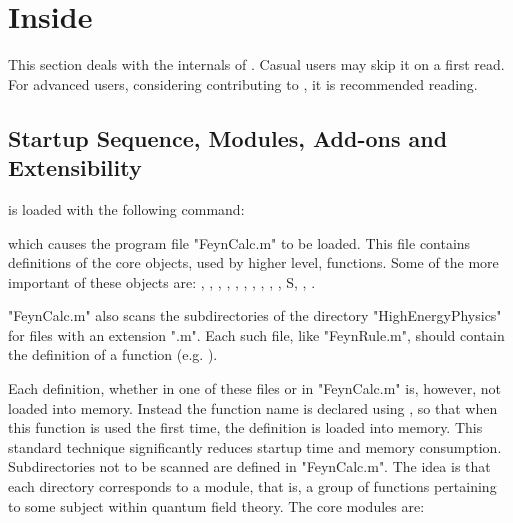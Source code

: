 \section{Inside \fc}
\label{inside}

This section deals with the internals of \fc. Casual users may skip it on a
first read. For advanced users, considering contributing to \fc, it is
recommended reading.

\subsection{Startup Sequence, Modules, Add-ons and Extensibility}
\label{modules}

\fc is loaded with the following command:


which causes the program file "FeynCalc.m" to be loaded. This file contains definitions of the core objects, used by higher level, functions. Some of the more important of these objects are: , , , , , , , , , , S, , .

"FeynCalc.m" also scans the subdirectories of the directory "HighEnergyPhysics" for files with an extension ".m". Each such file, like "FeynRule.m", should contain the definition of a function (e.g. ). 

Each definition, whether in one of these files or in "FeynCalc.m" is, however, not loaded into memory. Instead the function name is declared using , so that when this function is used the first time, the definition is loaded into memory. This standard technique significantly reduces startup time and memory consumption. Subdirectories not to be scanned are defined in "FeynCalc.m". The idea is that each directory corresponds to a module, that is, a group of functions pertaining to some subject within quantum field theory. The core modules are:

